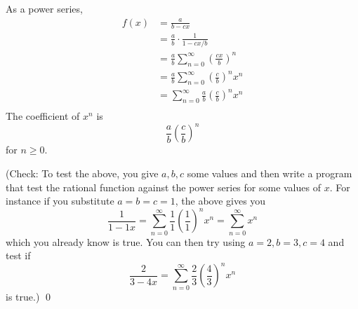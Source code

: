 As a power series,
\begin{align*}
f(x)
&= \frac{a}{b - cx} \\
&= \frac{a}{b} \cdot \frac{1}{1 - cx/b} \\
&= \frac{a}{b} \sum_{n=0}^\infty \left( \frac{cx}{b} \right)^n \\
&= \frac{a}{b} \sum_{n=0}^\infty \left( \frac{c}{b} \right)^n x^n\\
&= \sum_{n=0}^\infty \frac{a}{b} \left( \frac{c}{b} \right)^n x^n\\
\end{align*}
The coefficient of $x^n$ is
\[
\frac{a}{b} \left( \frac{c}{b} \right)^n
\]
for $n \geq 0$.

(Check: To test the above, you give $a,b,c$ some values and then
write a program that test the rational function against the power series
for some values of $x$.
For instance if you substitute $a=b=c=1$, the above gives you
\[
\frac{1}{1 - 1x} = \sum_{n=0}^\infty \frac{1}{1}\left(\frac{1}{1}\right)^n x^n
= \sum_{n=0}^\infty x^n
\]
which you already know is true.
You can then try using $a=2, b=3, c=4$ and test if
\[
\frac{2}{3 - 4x}
= \sum_{n=0}^\infty \frac{2}{3} \left( \frac{4}{3} \right)^n x^n
\]
is true.)
\qed
